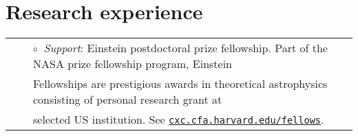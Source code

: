 \documentclass[letterpaper]{moderncv}
\begin{document}

\section{Research experience}

\vspace{-0.1cm}
\begin{tabular}{rcl}
&\hspace{0.4cm} &$\circ\;\;${\textit{Support}}: Einstein postdoctoral prize fellowship.  Part of the NASA prize fellowship program, Einstein\\
&\hspace{0.4cm} &  \hspace{0.4cm}Fellowships are prestigious awards in theoretical astrophysics consisting of personal research grant at\\
&\hspace{0.4cm} &  \hspace{0.4cm}selected US institution. See  \href{http://cxc.cfa.harvard.edu/fellows}{\texttt{cxc.cfa.harvard.edu/fellows}}.\\
\end{tabular}
\end{document}
